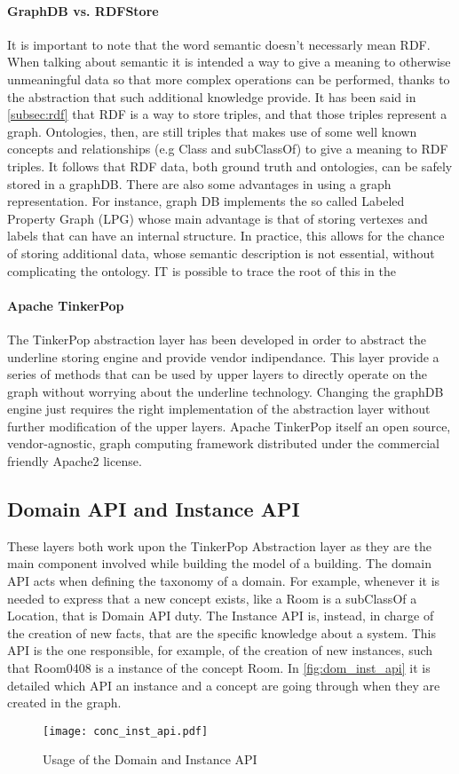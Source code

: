 \paragraph{GraphDB vs. RDFStore}
It is important to note that the word semantic doesn't necessarly mean RDF. When talking about semantic it is intended a way to give a meaning to otherwise unmeaningful data so that more complex operations can be performed, thanks to the abstraction that such additional knowledge provide. It has been said in \autoref{subsec:rdf} that RDF is a way to store triples, and that those triples represent a graph. Ontologies, then, are still triples that makes use of some well known concepts and relationships (e.g Class and subClassOf) to give a meaning to RDF triples. It follows that RDF data, both ground truth and ontologies, can be safely stored in a graphDB. There are also some advantages in using a graph representation. For instance, graph DB implements the so called Labeled Property Graph (LPG) whose main advantage is that of storing vertexes and labels that can have an internal structure. In practice, this allows for the chance of storing additional data, whose semantic description is not essential, without complicating the ontology. IT is possible to trace the root of this in the
\paragraph{Apache TinkerPop}
The TinkerPop abstraction layer has been developed in order to abstract the underline storing engine and provide vendor indipendance. This layer provide a series of methods that can be used by upper layers to directly operate on the graph without worrying about the underline technology. Changing the graphDB engine just requires the right implementation of the abstraction layer without further modification of the upper layers. Apache TinkerPop itself  an open source, vendor-agnostic, graph computing framework distributed under the commercial friendly Apache2 license.

\subsection{Domain API and Instance API}
These layers both work upon the TinkerPop Abstraction layer as they are the main component involved while building the model of a building. The domain API acts when defining the taxonomy of a domain. For example, whenever it is needed to express that a new concept exists, like a Room is a subClassOf a Location, that is Domain API duty. The Instance API is, instead, in charge of the creation of new facts, that are the specific knowledge about a system. This API is the one responsible, for example, of the creation of new instances, such that Room0408 is a instance of the concept Room. In \autoref{fig:dom_inst_api} it is detailed which API an instance and a concept are going through when they are created in the graph.
\begin{figure}
  \centering
  \texttt{[image: conc\_inst\_api.pdf]}
  \caption{Usage of the Domain and Instance API}
  \label{fig:dom_inst_api}
\end{figure}


